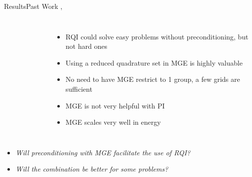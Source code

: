\documentclass[final]{beamer}
\begin{document}
\begin{frame}{}
\begin{columns}[t]
\begin{column}{.3\linewidth}
\begin{block}{\large Results\textemdash Past Work 
		              \cite{Slaybaugh2012}, \cite{Slaybaugh2013}}
\begin{columns}
\begin{figure}[h!]
	\end{figure}
	\begin{itemize}
	\item{RQI could solve easy problems without preconditioning, but not hard ones}
	\item{Using a reduced quadrature set in MGE is highly valuable}
	\item{No need to have MGE restrict to 1 group, a few grids are sufficient}
	\item{MGE is not very helpful with PI}
	\item{MGE scales very well in energy}
	\end{itemize}
\end{columns}
\vspace*{0.5 em}
	\begin{itemize}
	\item{\textit{Will preconditioning with MGE facilitate the use of RQI?}}
	\item{\textit{Will the combination be better for some problems?}}
	\end{itemize}
		\end{block}
	\vfill
      \end{column}



\end{columns}
\end{frame}
\end{document}
